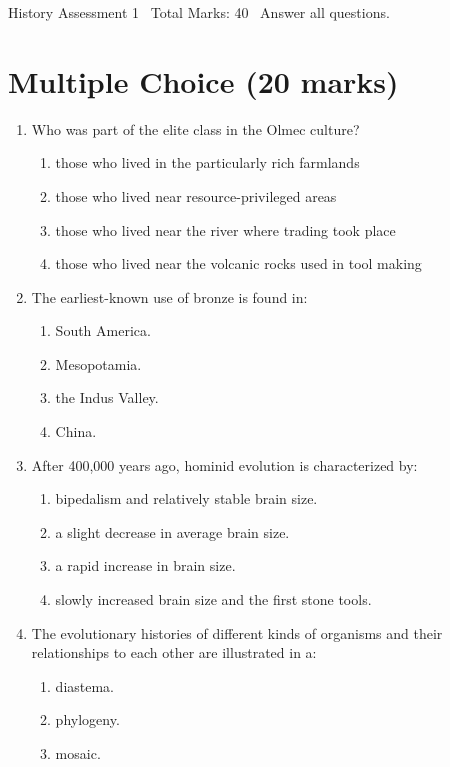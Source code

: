 \documentclass[12pt]{article}
\begin{document}
\begin{center}
History Assessment 1 \
Total Marks: 40 \
Answer all questions.
\end{center}

\section*{Multiple Choice (20 marks)}
\begin{enumerate}[label=\arabic*.]
\item Who was part of the elite class in the Olmec culture?
\begin{enumerate}[label=(\alph*)]
    \item those who lived in the particularly rich farmlands
    \item those who lived near resource-privileged areas
    \item those who lived near the river where trading took place
    \item those who lived near the volcanic rocks used in tool making
\end{enumerate}
\item The earliest-known use of bronze is found in:
\begin{enumerate}[label=(\alph*)]
    \item South America.
    \item Mesopotamia.
    \item the Indus Valley.
    \item China.
\end{enumerate}
\item After 400,000 years ago, hominid evolution is characterized by:
\begin{enumerate}[label=(\alph*)]
    \item bipedalism and relatively stable brain size.
    \item a slight decrease in average brain size.
    \item a rapid increase in brain size.
    \item slowly increased brain size and the first stone tools.
\end{enumerate}
\item The evolutionary histories of different kinds of organisms and their relationships to each other are illustrated in a:
\begin{enumerate}[label=(\alph*)]
    \item diastema.
    \item phylogeny.
    \item mosaic.

\end{enumerate}
\end{enumerate}
\end{document}

